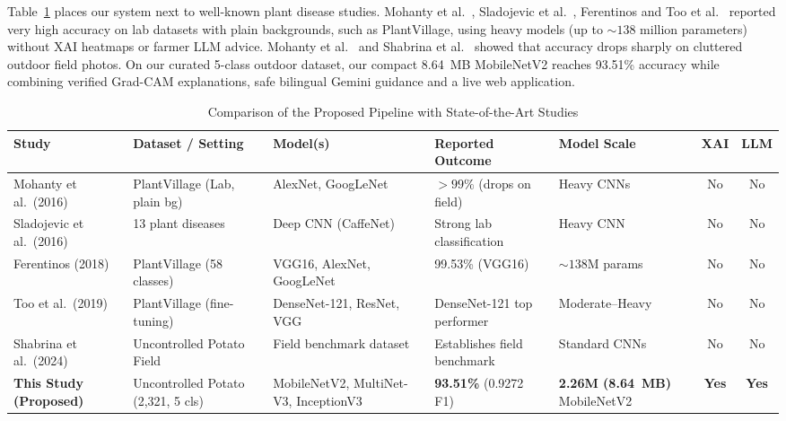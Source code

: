 Table~\ref{tab:sota_comp} places our system next to well-known plant disease studies. Mohanty et al.\ \cite{mohanty2016using}, Sladojevic et al.\ \cite{sladojevic2016deep}, Ferentinos \cite{ferentinos2018deep} and Too et al.\ \cite{too2019comparative} reported very high accuracy on lab datasets with plain backgrounds, such as PlantVillage, using heavy models (up to $\sim 138$ million parameters) without XAI heatmaps or farmer LLM advice. Mohanty et al.\ \cite{mohanty2016using} and Shabrina et al.\ \cite{shabrina2024novel} showed that accuracy drops sharply on cluttered outdoor field photos. On our curated 5-class outdoor dataset, our compact 8.64~MB MobileNetV2 reaches 93.51\% accuracy while combining verified Grad-CAM explanations, safe bilingual Gemini guidance and a live web application.

\begin{table}[htbp]
\caption{Comparison of the Proposed Pipeline with State-of-the-Art Studies}
\label{tab:sota_comp}
\begin{center}
\scriptsize
\begin{tabularx}{\textwidth}{| p{2.3cm} | p{2.4cm} | p{2.3cm} | p{2.0cm} | p{1.6cm} | c | c |}
\hline
\textbf{Study} & \textbf{Dataset / Setting} & \textbf{Model(s)} & \textbf{Reported Outcome} & \textbf{Model Scale} & \textbf{XAI} & \textbf{LLM} \\
\hline
Mohanty et al.\ (2016) \cite{mohanty2016using} & PlantVillage (Lab, plain bg) & AlexNet, GoogLeNet & $>99\%$ (drops on field) & Heavy CNNs & No & No \\
\hline
Sladojevic et al.\ (2016) \cite{sladojevic2016deep} & 13 plant diseases & Deep CNN (CaffeNet) & Strong lab classification & Heavy CNN & No & No \\
\hline
Ferentinos (2018) \cite{ferentinos2018deep} & PlantVillage (58 classes) & VGG16, AlexNet, GoogLeNet & 99.53\% (VGG16) & $\sim 138$M params & No & No \\
\hline
Too et al.\ (2019) \cite{too2019comparative} & PlantVillage (fine-tuning) & DenseNet-121, ResNet, VGG & DenseNet-121 top performer & Moderate--Heavy & No & No \\
\hline
Shabrina et al.\ (2024) \cite{shabrina2024novel} & Uncontrolled Potato Field & Field benchmark dataset & Establishes field benchmark & Standard CNNs & No & No \\
\hline
\textbf{This Study (Proposed)} & Uncontrolled Potato (2,321, 5 cls) & MobileNetV2, MultiNet-V3, InceptionV3 & \textbf{93.51\%} (0.9272 F1) & \textbf{2.26M (8.64~MB)} MobileNetV2 & \textbf{Yes} & \textbf{Yes} \\
\hline
\end{tabularx}
\end{center}
\end{table}

